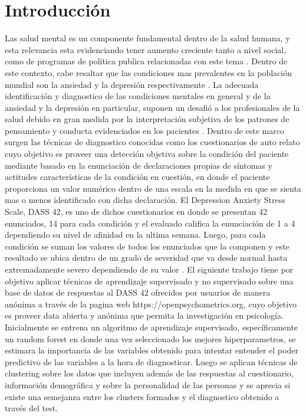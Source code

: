 \section{Introducción}
 Las salud mental es un componente fundamental dentro de la salud humana, y esta relevancia esta evidenciando tener aumento creciente tanto a nivel social, como de programas de política publica relacionadas con este tema \cite{world2018mental}.
 Dentro de este contexto, cabe resaltar que las condiciones mas prevalentes en la población mundial son la ansiedad y la depresión respectivamente \cite{james2018global}. 
 \medbreak
La  adecuada identificación y diagnostico de las condiciones mentales en general y de la ansiedad y la depresión en particular, suponen un desafió a los profesionales de la salud debido en gran medida por la interpretación subjetiva de los patrones de pensamiento y conducta evidenciados en los pacientes \cite{beck1961inventory}. 
 \medbreak
Dentro de este marco surgen las técnicas de diagnostico conocidas como los cuestionarios de auto relato cuyo objetivo es proveer una detección objetiva sobre la condición del paciente mediante basado en la enunciación de declaraciones propias de síntomas y actitudes características de la condición en cuestión, en donde el paciente proporciona un valor numérico dentro de una escala en la medida en que se sienta mas o menos identificado con dicha declaración. 
 \medbreak
El Depression Anxiety Stress Scale, DASS 42, es uno de dichos cuestionarios en donde se presentan 42 enunciados, 14 para cada condición y el evaluado califica la enunciación de 1 a 4 dependiendo su nivel de afinidad en la ultima semana. Luego, para cada condición se suman los valores de todos los enunciados que la componen y este resultado se ubica dentro de un grado de severidad que va desde normal hasta extremadamente severo  dependiendo de su valor  \cite{parkitny2010depression}. 
 \medbreak
El siguiente trabajo tiene por objetivo aplicar técnicas de aprendizaje supervisado y no supervisado sobre una base de datos de respuestas al DASS 42 ofrecidos por usuarios de manera anónima a través de la pagina web https://openpsychometrics.org, cuyo objetivo es proveer data abierta y anónima que permita la investigación en psicología. 
 \medbreak
Inicialmente se entrena un algoritmo de aprendizaje supervisado, específicamente un random forest en donde una vez seleccionado los mejores hiperparametros, se estimara la importancia de las variables obtenido para intentar entender el poder predictivo de las variables a la hora de diagnosticar.  Luego se aplican técnicas de clustering sobre los datos que incluyen además de las respuestas al cuestionario, información demográfica y sobre la personalidad de las personas y se aprecia si existe una semejanza entre los clusters formados y el diagnostico obtenido a través del test. 
 \medbreak